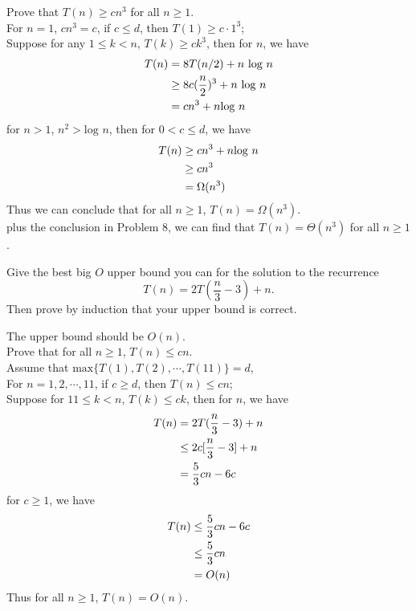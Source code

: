 \documentclass[11pt, a4paper, UTF8]{ctexart}
\begin{document}
\begin{solution}
  Prove that $T(n) \geq cn^{3}$ for all $n \geq 1$.\\
  For $n = 1$, $cn^{3} = c$, if $c \leq d$, then $T(1) \geq c\cdot 1^{3}$;\\
  Suppose for any $1 \leq k < n$, $T(k) \geq ck^{3}$, then for $n$, we have
  \begin{align}
    T(n) & = 8T(n/2) + n \text{ log } n \notag \\
         & \geq 8c(\frac{n}{2})^{3} + n \text{ log } n \notag \\
         & = cn^{3} + n \text{log }n \notag
  \end{align}
  for $n > 1$, $n^{2} > \text{log }n$, then for $0 < c \leq d$, we have
  \begin{align}
    T(n) & \geq cn^{3} + n \text{log }n \notag \\
         & \geq cn^{3} \notag \\
         & = \Omega (n^{3}) \notag
  \end{align}
  Thus we can conclude that for all $n \geq 1$, $T(n) = \Omega (n^{3})$.\\
  plus the conclusion in Problem 8, we can find that $T(n) = \Theta (n^{3})$ 
  for all $n \geq 1$.
\end{solution}

\begin{problem}[CS: 4.5.10]
  Give the best big $O$ upper bound you can for the solution to the recurrence
  \[ T(n) = 2T(\frac{n}{3} - 3) + n. \]
  Then prove by induction that your upper bound is correct.
\end{problem}

\begin{solution}
  The upper bound should be $O(n)$.\\
  Prove that for all $n \geq 1$, $T(n) \leq cn$.\\
  Assume that $\text{max} \{ T(1),T(2),\cdots,T(11) \} = d$,\\
  For $n = 1,2,\cdots,11$, if $c \geq d$, then $T(n) \leq cn$;\\
  Suppose for $11 \leq k < n$, $T(k) \leq ck$, then for $n$, we have
  \begin{align}
    T(n) & = 2T(\frac{n}{3} - 3) + n \notag \\
         & \leq 2c[\frac{n}{3} - 3] + n \notag \\
         & = \frac{5}{3}cn - 6c \notag
  \end{align}
  for $c \geq 1$, we have
  \begin{align}
    T(n) & \leq \frac{5}{3}cn - 6c \notag \\
         & \leq \frac{5}{3}cn \notag \\
         & = O(n) \notag
  \end{align}
  Thus for all $n \geq 1$, $T(n) = O(n)$.
\end{solution}

\end{document}
